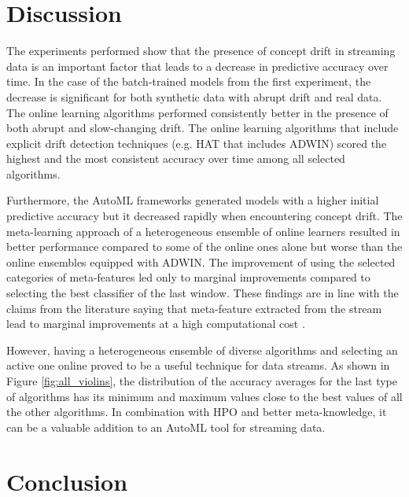 \documentclass{sig-alternate-br}
\begin{document}
\begin{figure*}[hbt!]
\centering 
{}
\caption{All models accuracy averages distribution, mean (red) and median (green)}
\label{fig:all_violins}
\end{figure*}

\section{Discussion}

The experiments performed show that the presence of concept drift in streaming data is an important factor that leads to a decrease in predictive accuracy over time. In the case of the batch-trained models from the first experiment, the decrease is significant for both synthetic data with abrupt drift and real data. The online learning algorithms performed consistently better in the presence of both abrupt and slow-changing drift. The online learning algorithms that include explicit drift detection techniques (e.g. HAT that includes ADWIN) scored the highest and the most consistent accuracy over time among all selected algorithms.

Furthermore, the AutoML frameworks generated models with a higher initial predictive accuracy but it decreased rapidly when encountering concept drift. The meta-learning approach of a heterogeneous ensemble of online learners resulted in better performance compared to some of the online ones alone but worse than the online ensembles equipped with ADWIN. The improvement of using the selected categories of meta-features led only to marginal improvements compared to selecting the best classifier of the last window. These findings are in line with the claims from the literature saying that meta-feature extracted from the stream lead to marginal improvements at a high computational cost \cite{van2018online}. 

However, having a heterogeneous ensemble of diverse algorithms and selecting an active one online proved to be a useful technique for data streams. As shown in Figure \ref{fig:all_violins}, the distribution of the accuracy averages for the last type of algorithms has its minimum and maximum values close to the best values of all the other algorithms. In combination with HPO and better meta-knowledge, it can be a valuable addition to an AutoML tool for streaming data. 

\section{Conclusion}
\end{document}

